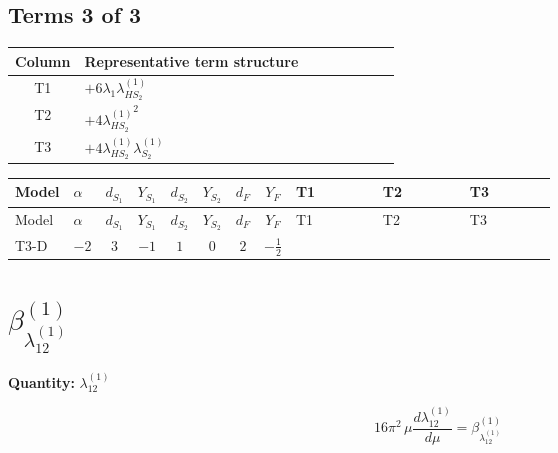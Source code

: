 \documentclass[8pt]{article}
\begin{document}
\begin{landscape}
\subsection*{Terms 3 of 3}
\begin{center}
\begin{tabular}{@{}c >{\raggedright\arraybackslash}p{0.82\linewidth}@{}}
\toprule
Column & Representative term structure \\
\midrule
T1 & \(\displaystyle +6 {\lambda_1} {\lambda_{HS_2}^{(1)}}\) \\
\midrule
T2 & \(\displaystyle +4 {\lambda_{HS_2}^{(1)}}^2\) \\
\midrule
T3 & \(\displaystyle +4 {\lambda_{HS_2}^{(1)}} {\lambda_{S_2}^{(1)}}\) \\
\midrule
\bottomrule
\end{tabular}
\end{center}
\smallskip
\tiny
\begin{longtable}{@{}llcccccc >{\raggedright\arraybackslash}p{0.21\linewidth} >{\raggedright\arraybackslash}p{0.21\linewidth} >{\raggedright\arraybackslash}p{0.21\linewidth}@{}}
\toprule
Model & $\alpha$ & $d_{S_1}$ & $Y_{S_1}$ & $d_{S_2}$ & $Y_{S_2}$ & $d_F$ & $Y_F$ & T1 & T2 & T3 \\
\midrule
\endfirsthead
\toprule
Model & $\alpha$ & $d_{S_1}$ & $Y_{S_1}$ & $d_{S_2}$ & $Y_{S_2}$ & $d_F$ & $Y_F$ & T1 & T2 & T3 \\
\midrule
\endhead
T3-D & $-2$ & $3$ & $-1$ & $1$ & $0$ & $2$ & $-\frac{1}{2}$ & \scriptsize\adjustbox{max width=\linewidth}{$\begin{gathered} +6 {\lambda_1} {\lambda_{HS_2}^{(1)}}\end{gathered}$} & \scriptsize\adjustbox{max width=\linewidth}{$\begin{gathered} +4 {\lambda_{HS_2}^{(1)}}^2\end{gathered}$} & \scriptsize\adjustbox{max width=\linewidth}{$\begin{gathered} +4 {\lambda_{HS_2}^{(1)}} {\lambda_{S_2}^{(1)}}\end{gathered}$} \\
\midrule
\bottomrule
\end{longtable}
\clearpage
\section*{$\beta_{\lambda_{12}^{(1)}}^{(1)}$}
\noindent\textbf{Quantity: }$\lambda_{12}^{(1)}$\par\smallskip
\[16\pi^2\,\mu\frac{d \lambda_{12}^{(1)}}{d\mu}=\beta_{\lambda_{12}^{(1)}}^{(1)}\]

\end{landscape}
\end{document}
